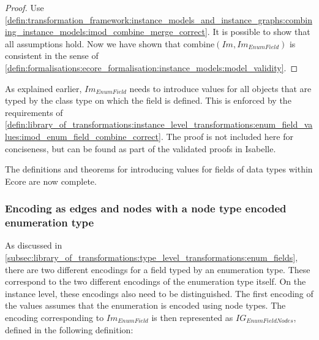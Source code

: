 \begin{proof}
Use \cref{defin:transformation_framework:instance_models_and_instance_graphs:combining_instance_models:imod_combine_merge_correct}. It is possible to show that all assumptions hold. Now we have shown that $\mathrm{combine}(Im, Im_{EnumField})$ is consistent in the sense of \cref{defin:formalisations:ecore_formalisation:instance_models:model_validity}.
\end{proof}

As explained earlier, $Im_{EnumField}$ needs to introduce values for all objects that are typed by the class type on which the field is defined. This is enforced by the requirements of \cref{defin:library_of_transformations:instance_level_transformations:enum_field_values:imod_enum_field_combine_correct}. The proof is not included here for conciseness, but can be found as part of the validated proofs in Isabelle.

The definitions and theorems for introducing values for fields of data types within Ecore are now complete. 

\subsubsection{Encoding as edges and nodes with a node type encoded enumeration type}

As discussed in \cref{subsec:library_of_transformations:type_level_transformations:enum_fields}, there are two different encodings for a field typed by an enumeration type. These correspond to the two different encodings of the enumeration type itself. On the instance level, these encodings also need to be distinguished. The first encoding of the values assumes that the enumeration is encoded using node types. The encoding corresponding to $Im_{EnumField}$ is then represented as $IG_{EnumFieldNodes}$, defined in the following definition:

